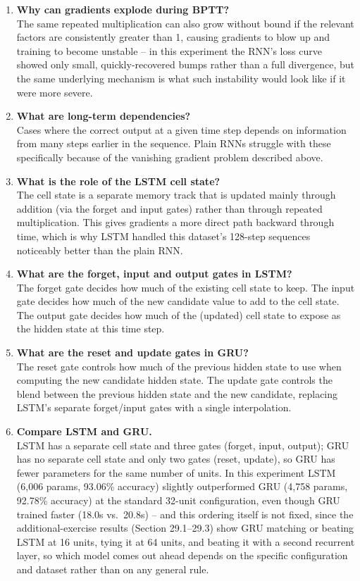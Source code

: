 \documentclass[10pt]{article}
\begin{document}
\begin{enumerate}
\item \textbf{Why can gradients explode during BPTT?}\\
The same repeated multiplication can also grow without bound if the
relevant factors are consistently greater than 1, causing gradients to blow
up and training to become unstable -- in this experiment the RNN's loss
curve showed only small, quickly-recovered bumps rather than a full
divergence, but the same underlying mechanism is what such instability
would look like if it were more severe.

\item \textbf{What are long-term dependencies?}\\
Cases where the correct output at a given time step depends on information
from many steps earlier in the sequence. Plain RNNs struggle with these
specifically because of the vanishing gradient problem described above.

\item \textbf{What is the role of the LSTM cell state?}\\
The cell state is a separate memory track that is updated mainly through
addition (via the forget and input gates) rather than through repeated
multiplication. This gives gradients a more direct path backward through
time, which is why LSTM handled this dataset's 128-step sequences
noticeably better than the plain RNN.

\item \textbf{What are the forget, input and output gates in LSTM?}\\
The forget gate decides how much of the existing cell state to keep. The
input gate decides how much of the new candidate value to add to the cell
state. The output gate decides how much of the (updated) cell state to
expose as the hidden state at this time step.

\item \textbf{What are the reset and update gates in GRU?}\\
The reset gate controls how much of the previous hidden state to use when
computing the new candidate hidden state. The update gate controls the
blend between the previous hidden state and the new candidate, replacing
LSTM's separate forget/input gates with a single interpolation.

\item \textbf{Compare LSTM and GRU.}\\
LSTM has a separate cell state and three gates (forget, input, output);
GRU has no separate cell state and only two gates (reset, update), so GRU
has fewer parameters for the same number of units. In this experiment LSTM
(6,006 params, 93.06\% accuracy) slightly outperformed GRU (4,758 params,
92.78\% accuracy) at the standard 32-unit configuration, even though GRU
trained faster (18.0s vs.\ 20.8s) -- and this ordering itself is not fixed,
since the additional-exercise results (Section 29.1--29.3) show GRU
matching or beating LSTM at 16 units, tying it at 64 units, and beating it
with a second recurrent layer, so which model comes out ahead depends on
the specific configuration and dataset rather than on any general rule.


\end{enumerate}
\end{document}
